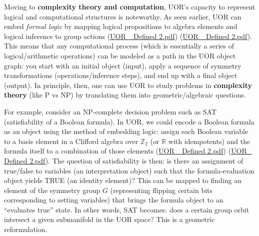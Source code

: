 \documentclass[12pt]{article}
\begin{document}
\medskip

Moving to \textbf{complexity theory and computation}, UOR’s capacity to represent logical and computational structures is noteworthy. As seen earlier, UOR can embed \emph{formal logic} by mapping logical propositions to algebra elements and logical inference to group actions (\href{file://file-TBF3nHDaRR5QeVMmwCFYkp#:~:text=duality%29,suggests%20UOR%20could%20provide%20a}{UOR\_ Defined 2.pdf}) (\href{file://file-TBF3nHDaRR5QeVMmwCFYkp#:~:text=algebraic%20embeddings,or%20topological%20properties%20of%20the}{UOR\_ Defined 2.pdf}). This means that any computational process (which is essentially a series of logical/arithmetic operations) can be modeled as a path in the UOR object graph: you start with an initial object (input), apply a sequence of symmetry transformations (operations/inference steps), and end up with a final object (output). In principle, then, one can use UOR to study problems in \textbf{complexity theory} (like P vs NP) by translating them into geometric/algebraic questions.

\medskip

For example, consider an NP-complete decision problem such as SAT (satisfiability of a Boolean formula). In UOR, we could encode a Boolean formula as an object using the method of embedding logic: assign each Boolean variable to a basis element in a Clifford algebra over $\mathbb{Z}_2$ (or $\mathbb{R}$ with idempotents) and the formula itself to a combination of those elements (\href{file://file-TBF3nHDaRR5QeVMmwCFYkp#:~:text=values%20as%20elements%20of%20a,and%20the%20symmetry%20group}{UOR\_ Defined 2.pdf}) (\href{file://file-TBF3nHDaRR5QeVMmwCFYkp#:~:text=include%20the%20permutation%20of%20variables,rules%20or%20symmetry%20transformations%20of}{UOR\_ Defined 2.pdf}). The question of satisfiability is then: is there an assignment of true/false to variables (an interpretation object) such that the formula-evaluation object yields TRUE (an identity element)? This can be mapped to finding an element of the symmetry group $G$ (representing flipping certain bits corresponding to setting variables) that brings the formula object to an “evaluates true” state. In other words, SAT becomes: does a certain group orbit intersect a given submanifold in the UOR space? This is a geometric reformulation.

\medskip
\end{document}
